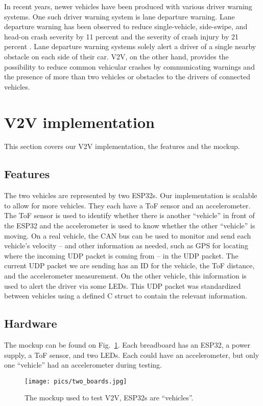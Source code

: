 \documentclass[conference]{IEEEtran}
\begin{document}
In recent years, newer vehicles have been produced with various driver warning systems.
One such driver warning system is lane departure warning. Lane departure warning has been
observed to reduce single-vehicle, side-swipe, and head-on crash severity by 11 percent
and the severity of crash injury by 21 percent \cite{iihs_bsd}. Lane departure warning
systems solely alert a driver of a single nearby obstacle on each side of their car.
V2V, on the other hand, provides the possibility to reduce common vehicular crashes by
communicating warnings and the presence of more than two vehicles or obstacles to the
drivers of connected vehicles.

\section{V2V implementation}
This section covers our V2V implementation, the features and the mockup.

\subsection{Features}
The two vehicles are represented by two ESP32s. Our implementation is scalable 
to allow for more vehicles. They each have a ToF sensor and
an accelerometer. The ToF sensor is used to identify whether there is another
``vehicle'' in front of the ESP32 and the accelerometer is used to know whether
the other ``vehicle'' is moving. On a real vehicle, the CAN bus can be used to
monitor and send each vehicle's velocity -- and other information as needed,
such as GPS for locating where the incoming UDP packet is coming from -- in the
UDP packet. The current UDP packet we are sending has an ID for the vehicle, the
ToF distance, and the accelerometer measurement. On the other vehicle, this
information is used to alert the driver via some LEDs. This UDP packet was standardized
between vehicles using a defined C struct to contain the relevant information.

\subsection{Hardware}
The mockup can be found on Fig.~\ref{mockup}. Each breadboard has an ESP32, a
power supply, a ToF sensor, and two LEDs. Each could have an accelerometer, but
only one ``vehicle'' had an accelerometer during testing.

\begin{figure}[htbp]
\centerline{\texttt{[image: pics/two\_boards.jpg]}}
\caption{The mockup used to test V2V, ESP32s are ``vehicles''.}
\label{mockup}
\end{figure}
\end{document}
